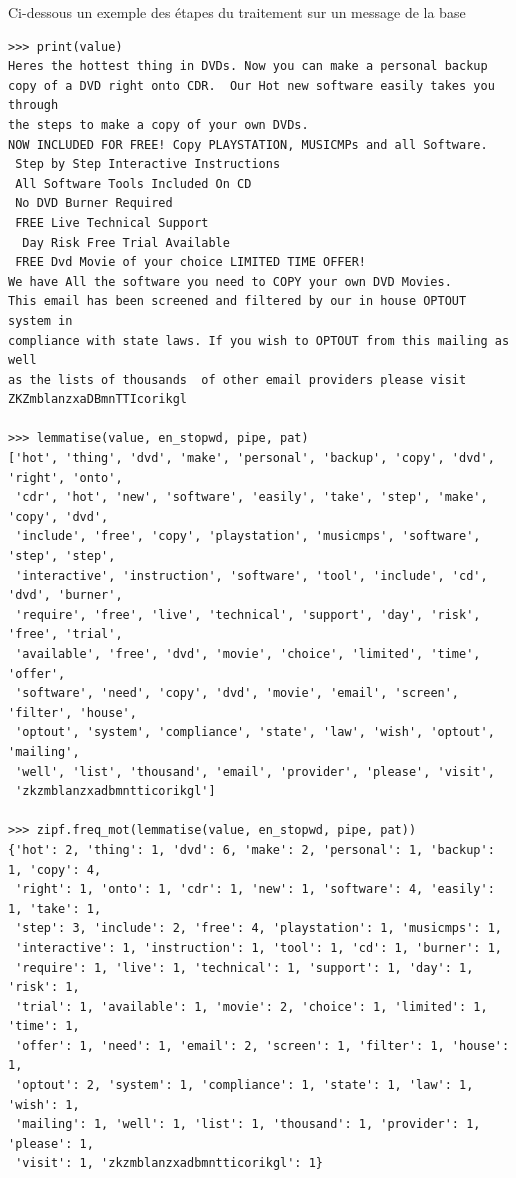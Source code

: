 			Ci-dessous un exemple des étapes du traitement sur un message de la base
			\begin{verbatim}
>>> print(value)
Heres the hottest thing in DVDs. Now you can make a personal backup
copy of a DVD right onto CDR.  Our Hot new software easily takes you through
the steps to make a copy of your own DVDs.
NOW INCLUDED FOR FREE! Copy PLAYSTATION, MUSICMPs and all Software.
 Step by Step Interactive Instructions
 All Software Tools Included On CD
 No DVD Burner Required
 FREE Live Technical Support
  Day Risk Free Trial Available
 FREE Dvd Movie of your choice LIMITED TIME OFFER!
We have All the software you need to COPY your own DVD Movies.
This email has been screened and filtered by our in house OPTOUT system in
compliance with state laws. If you wish to OPTOUT from this mailing as well
as the lists of thousands  of other email providers please visit
ZKZmblanzxaDBmnTTIcorikgl

>>> lemmatise(value, en_stopwd, pipe, pat)
['hot', 'thing', 'dvd', 'make', 'personal', 'backup', 'copy', 'dvd', 'right', 'onto',
 'cdr', 'hot', 'new', 'software', 'easily', 'take', 'step', 'make', 'copy', 'dvd',
 'include', 'free', 'copy', 'playstation', 'musicmps', 'software', 'step', 'step',
 'interactive', 'instruction', 'software', 'tool', 'include', 'cd', 'dvd', 'burner',
 'require', 'free', 'live', 'technical', 'support', 'day', 'risk', 'free', 'trial',
 'available', 'free', 'dvd', 'movie', 'choice', 'limited', 'time', 'offer',
 'software', 'need', 'copy', 'dvd', 'movie', 'email', 'screen', 'filter', 'house',
 'optout', 'system', 'compliance', 'state', 'law', 'wish', 'optout', 'mailing',
 'well', 'list', 'thousand', 'email', 'provider', 'please', 'visit',
 'zkzmblanzxadbmntticorikgl']

>>> zipf.freq_mot(lemmatise(value, en_stopwd, pipe, pat))
{'hot': 2, 'thing': 1, 'dvd': 6, 'make': 2, 'personal': 1, 'backup': 1, 'copy': 4,
 'right': 1, 'onto': 1, 'cdr': 1, 'new': 1, 'software': 4, 'easily': 1, 'take': 1,
 'step': 3, 'include': 2, 'free': 4, 'playstation': 1, 'musicmps': 1,
 'interactive': 1, 'instruction': 1, 'tool': 1, 'cd': 1, 'burner': 1,
 'require': 1, 'live': 1, 'technical': 1, 'support': 1, 'day': 1, 'risk': 1,
 'trial': 1, 'available': 1, 'movie': 2, 'choice': 1, 'limited': 1, 'time': 1,
 'offer': 1, 'need': 1, 'email': 2, 'screen': 1, 'filter': 1, 'house': 1,
 'optout': 2, 'system': 1, 'compliance': 1, 'state': 1, 'law': 1, 'wish': 1,
 'mailing': 1, 'well': 1, 'list': 1, 'thousand': 1, 'provider': 1, 'please': 1,
 'visit': 1, 'zkzmblanzxadbmntticorikgl': 1}
			\end{verbatim}

